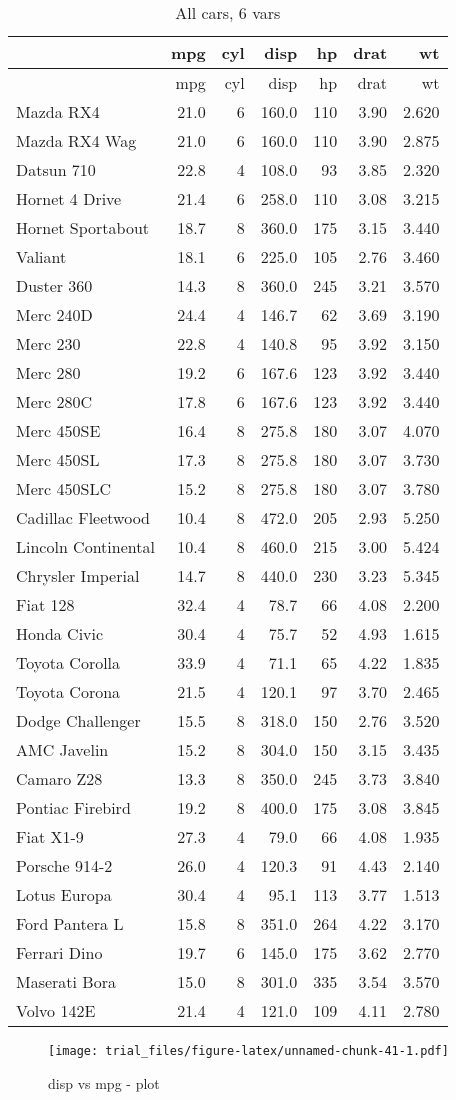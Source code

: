 \documentclass[]{article}
\begin{document}
\begin{longtable}[]{@{}lrrrrrr@{}}
\caption{All cars, 6 vars}\tabularnewline
\toprule
& mpg & cyl & disp & hp & drat & wt\tabularnewline
\midrule
\endfirsthead
\toprule
& mpg & cyl & disp & hp & drat & wt\tabularnewline
\midrule
\endhead
Mazda RX4 & 21.0 & 6 & 160.0 & 110 & 3.90 & 2.620\tabularnewline
Mazda RX4 Wag & 21.0 & 6 & 160.0 & 110 & 3.90 & 2.875\tabularnewline
Datsun 710 & 22.8 & 4 & 108.0 & 93 & 3.85 & 2.320\tabularnewline
Hornet 4 Drive & 21.4 & 6 & 258.0 & 110 & 3.08 & 3.215\tabularnewline
Hornet Sportabout & 18.7 & 8 & 360.0 & 175 & 3.15 & 3.440\tabularnewline
Valiant & 18.1 & 6 & 225.0 & 105 & 2.76 & 3.460\tabularnewline
Duster 360 & 14.3 & 8 & 360.0 & 245 & 3.21 & 3.570\tabularnewline
Merc 240D & 24.4 & 4 & 146.7 & 62 & 3.69 & 3.190\tabularnewline
Merc 230 & 22.8 & 4 & 140.8 & 95 & 3.92 & 3.150\tabularnewline
Merc 280 & 19.2 & 6 & 167.6 & 123 & 3.92 & 3.440\tabularnewline
Merc 280C & 17.8 & 6 & 167.6 & 123 & 3.92 & 3.440\tabularnewline
Merc 450SE & 16.4 & 8 & 275.8 & 180 & 3.07 & 4.070\tabularnewline
Merc 450SL & 17.3 & 8 & 275.8 & 180 & 3.07 & 3.730\tabularnewline
Merc 450SLC & 15.2 & 8 & 275.8 & 180 & 3.07 & 3.780\tabularnewline
Cadillac Fleetwood & 10.4 & 8 & 472.0 & 205 & 2.93 &
5.250\tabularnewline
Lincoln Continental & 10.4 & 8 & 460.0 & 215 & 3.00 &
5.424\tabularnewline
Chrysler Imperial & 14.7 & 8 & 440.0 & 230 & 3.23 & 5.345\tabularnewline
Fiat 128 & 32.4 & 4 & 78.7 & 66 & 4.08 & 2.200\tabularnewline
Honda Civic & 30.4 & 4 & 75.7 & 52 & 4.93 & 1.615\tabularnewline
Toyota Corolla & 33.9 & 4 & 71.1 & 65 & 4.22 & 1.835\tabularnewline
Toyota Corona & 21.5 & 4 & 120.1 & 97 & 3.70 & 2.465\tabularnewline
Dodge Challenger & 15.5 & 8 & 318.0 & 150 & 2.76 & 3.520\tabularnewline
AMC Javelin & 15.2 & 8 & 304.0 & 150 & 3.15 & 3.435\tabularnewline
Camaro Z28 & 13.3 & 8 & 350.0 & 245 & 3.73 & 3.840\tabularnewline
Pontiac Firebird & 19.2 & 8 & 400.0 & 175 & 3.08 & 3.845\tabularnewline
Fiat X1-9 & 27.3 & 4 & 79.0 & 66 & 4.08 & 1.935\tabularnewline
Porsche 914-2 & 26.0 & 4 & 120.3 & 91 & 4.43 & 2.140\tabularnewline
Lotus Europa & 30.4 & 4 & 95.1 & 113 & 3.77 & 1.513\tabularnewline
Ford Pantera L & 15.8 & 8 & 351.0 & 264 & 4.22 & 3.170\tabularnewline
Ferrari Dino & 19.7 & 6 & 145.0 & 175 & 3.62 & 2.770\tabularnewline
Maserati Bora & 15.0 & 8 & 301.0 & 335 & 3.54 & 3.570\tabularnewline
Volvo 142E & 21.4 & 4 & 121.0 & 109 & 4.11 & 2.780\tabularnewline
\bottomrule
\end{longtable}

\begin{figure}[htbp]
\centering
\texttt{[image: trial\_files/figure-latex/unnamed-chunk-41-1.pdf]}
\caption{disp vs mpg - plot}
\end{figure}
\end{document}
